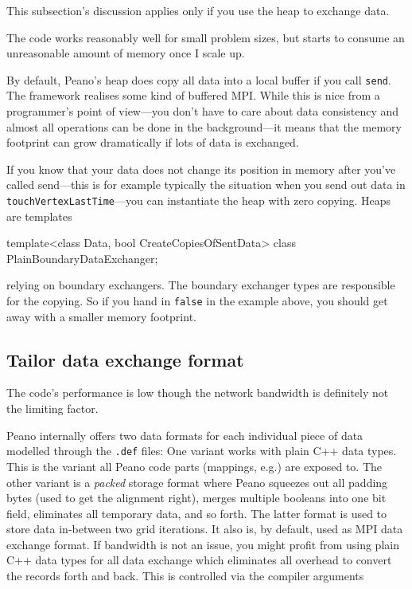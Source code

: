 This subsection's discussion applies only if you use the heap to exchange data.

\begin{smell}
  The code works reasonably well for small problem sizes, but starts to consume 
  an unreasonable amount of memory once I scale up.
\end{smell}

\noindent
By default, Peano's heap does copy all data into a local buffer if you call \texttt{send}.
The framework realises some kind of buffered MPI.
While this is nice from a programmer's point of view---you don't have to care about
data consistency and almost all operations can be done in the background---it means
that the memory footprint can grow dramatically if lots of data is exchanged.


If you know that your data does not change its position in memory after you've 
called send---this is for example typically the situation when you send out data in 
\texttt{touchVertexLastTime}---you can instantiate the heap with zero copying.
Heaps are templates
\begin{code}
template<class Data, bool CreateCopiesOfSentData>
class PlainBoundaryDataExchanger;
\end{code} 
relying on boundary exchangers. The boundary exchanger types are responsible 
for the copying. 
So if you hand in \texttt{false} in the example above, you should get away
with a smaller memory footprint.




\subsection{Tailor data exchange format}

\begin{smell}
 The code's performance is low though the network bandwidth is definitely not
 the limiting factor.
\end{smell}


Peano internally offers two data formats for each individual piece of data
modelled through the \texttt{.def} files:
One variant works with plain C++ data types. 
This is the variant all Peano code parts (mappings, e.g.) are exposed to.
The other variant is a {\em packed} storage format where Peano squeezes out
all padding bytes (used to get the alignment right), merges multiple booleans
into one bit field, eliminates all temporary data, and so forth.
The latter format is used to store data in-between two grid iterations.
It also is, by default, used as MPI data exchange format.
If bandwidth is not an issue, you might profit from using plain C++ data types
for all data exchange which eliminates all overhead to convert the records forth
and back.
This is controlled via the compiler arguments


